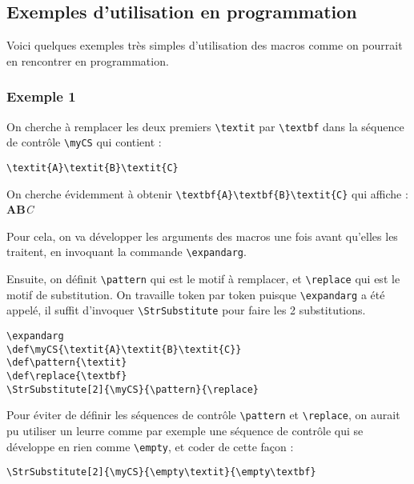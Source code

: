 \documentclass[a4paper,10pt]{article}
\newcommand\guill[1]{\og{}#1\fg{}}
\newcommand\styleexercice{\footnotesize}
\newcommand\verbinline{\lstinline[basicstyle=\normalsize\ttfamily]}
\begin{document}
\subsection{Exemples d'utilisation en programmation}
\label{exemples}
Voici quelques exemples très simples d'utilisation des macros comme on pourrait en rencontrer en programmation.

\subsubsection{Exemple 1}
On cherche à remplacer les deux premiers \verb|\textit| par \verb|\textbf| dans la séquence de contrôle \verb|\myCS| qui contient :\par\nobreak\smallskip
\hfill\verb|\textit{A}\textit{B}\textit{C}|\hfill{}
\medskip

On cherche évidemment à obtenir \verb|\textbf{A}\textbf{B}\textit{C}| qui affiche : \textbf{A}\textbf{B}\textit{C}\medskip

Pour cela, on va développer les arguments des macros une fois avant qu'elles les traitent, en invoquant la commande \verbinline|\expandarg|.

Ensuite, on définit \verb|\pattern| qui est le motif à remplacer, et \verb|\replace| qui est le motif de substitution. On travaille token par token puisque \verbinline|\expandarg| a été appelé, il suffit d'invoquer \verbinline|\StrSubstitute| pour faire les 2 substitutions.\medskip

\begin{minipage}[c]{0.65\linewidth}
\begin{lstlisting}
\expandarg
\def\myCS{\textit{A}\textit{B}\textit{C}}
\def\pattern{\textit}
\def\replace{\textbf}
\StrSubstitute[2]{\myCS}{\pattern}{\replace}
\end{lstlisting}%
\end{minipage}\hfill
\begin{minipage}[c]{0.35\linewidth}
	\styleexercice
	\expandarg
	\def\myCS{\textit{A}\textit{B}\textit{C}}
	\def\pattern{\textit}
	\def\replace{\textbf}
	\StrSubstitute[2]{\myCS}{\pattern}{\replace}
\end{minipage}%
\medskip

Pour éviter de définir les séquences de contrôle \verb|\pattern| et \verb|\replace|, on aurait pu utiliser un leurre comme par exemple une séquence de contrôle qui se développe en \guill{rien} comme \verb|\empty|, et coder de cette façon :\par\smallskip
\hfil\verbinline|\StrSubstitute[2]{\myCS}{\empty\textit}{\empty\textbf}|\hfil{}\medskip
\end{document}
